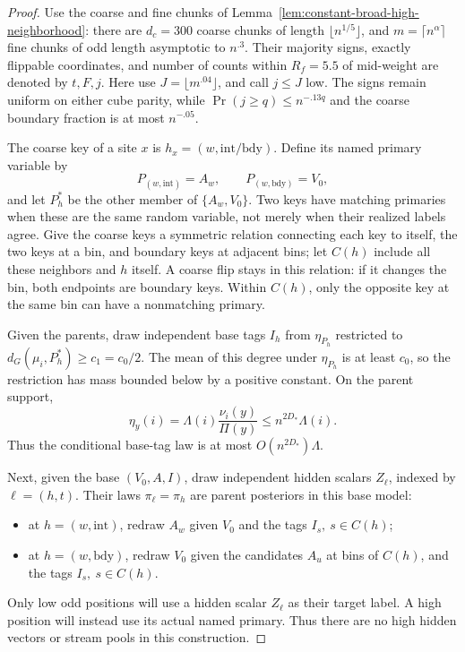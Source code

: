 \begin{proof}
Use the coarse and fine chunks of
Lemma~\ref{lem:constant-broad-high-neighborhood}: there are \(d_c=300\)
coarse chunks of length \(\lfloor n^{1/5}\rfloor\), and
\(m=\lceil n^\alpha\rceil\) fine chunks of odd length asymptotic to
\(n^{.3}\). Their majority signs, exactly flippable coordinates, and
number of counts within \(R_f=5.5\) of mid-weight are denoted by
\(t,F,j\). Here use \(J=\lfloor m^{.04}\rfloor\), and call \(j\le J\)
low. The signs remain uniform on either cube parity, while
\(\Pr(j\ge q)\le n^{-.13q}\) and the coarse boundary fraction is at most
\(n^{-.05}\).

The coarse key of a site \(x\) is \(h_x=(w,\mathrm{int/bdy})\).
Define its named primary variable by
\[
 P_{(w,\mathrm{int})}=A_w,\qquad
 P_{(w,\mathrm{bdy})}=V_0,
\]
and let \(P_h^*\) be the other member of \(\{A_w,V_0\}\).
Two keys have matching primaries when these are the same random variable,
not merely when their realized labels agree. Give the coarse keys a
symmetric relation connecting each key to itself, the two keys at a bin,
and boundary keys at adjacent bins; let \(C(h)\) include all these
neighbors and \(h\) itself. A coarse flip stays in this relation: if it
changes the bin, both endpoints are boundary keys. Within \(C(h)\), only
the opposite key at the same bin can have a nonmatching primary.

Given the parents, draw independent base tags \(I_h\) from
\(\eta_{P_h}\) restricted to
\(d_G(\mu_i,P_h^*)\ge c_1=c_0/2\).
The mean of this degree under \(\eta_{P_h}\) is at least \(c_0\), so
the restriction has mass bounded below by a positive constant.
On the parent support,
\[
 \eta_y(i)=\Lambda(i)\frac{\nu_i(y)}{\Pi(y)}
 \le n^{2D_*}\Lambda(i).
\]
Thus the conditional base-tag law is at most
\(O(n^{2D_*})\Lambda\).

Next, given the base \((V_0,A,I)\), draw independent hidden scalars
\(Z_\ell\), indexed by \(\ell=(h,t)\). Their laws
\(\pi_\ell=\pi_h\) are parent posteriors in this base model:

\begin{itemize}
\item at \(h=(w,\mathrm{int})\), redraw \(A_w\) given \(V_0\) and the tags \(I_s,\ s\in C(h)\);
\item at \(h=(w,\mathrm{bdy})\), redraw \(V_0\) given the candidates \(A_u\) at bins of \(C(h)\), and the tags \(I_s,\ s\in C(h)\).
\end{itemize}
Only low odd positions will use a hidden scalar \(Z_\ell\) as their target
label. A high position will instead use its actual named primary. Thus
there are no high hidden vectors or stream pools in this construction.


\end{proof}
